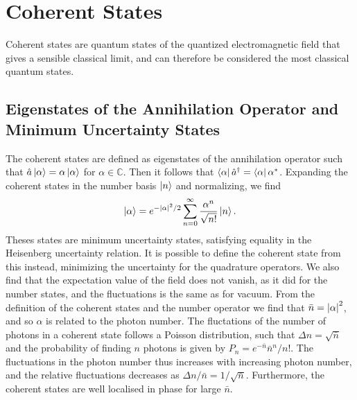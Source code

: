 \section{Coherent States}
Coherent states are quantum states of the quantized electromagnetic field that gives a sensible classical limit, and can therefore be considered the most classical quantum states. 
\subsection{Eigenstates of the Annihilation Operator and Minimum Uncertainty States}
The coherent states are defined as eigenstates of the annihilation operator such that $\hat{a} \ket{\alpha} = \alpha \ket{\alpha}$ for $\alpha \in \mathbb{C}$. Then it follows that $\bra{\alpha}\hat{a}^\dagger = \bra{\alpha}\alpha^*$. Expanding the coherent states in the number basis $\ket{n}$ and normalizing, we find 
\begin{equation}
    \ket{\alpha} = e^{-\abs{\alpha}^2/2} \sum_{n=0}^{\infty} \frac{\alpha^n}{\sqrt{n!}}\ket{n}.
\end{equation}
Theses states are minimum uncertainty states, satisfying equality in the Heisenberg uncertainty relation. It is possible to define the coherent state from this instead, minimizing the uncertainty for the quadrature operators. We also find that the expectation value of the field does not vanish, as it did for the number states, and the fluctuations is the same as for vacuum. From the definition of the coherent states and the number operator we find that $\bar n = \abs{\alpha}^2$, and so $\alpha$ is related to the photon number. The fluctations of the number of photons in a coherent state follows a Poisson distribution, such that $\Delta n = \sqrt{\bar n}$ and the probability of finding $n$ photons is given by $P_n = e^{-\bar n} \bar{n}^n / n!$. The fluctuations in the photon number thus increases with increasing photon number, and the relative fluctuations decreases as $\Delta n / \bar n = 1/\sqrt{\bar n}$. Furthermore, the coherent states are well localised in phase for large $\bar n$.

